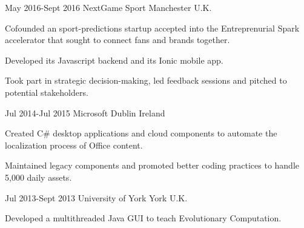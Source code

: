 \documentclass[10pt]{CurriculumVitae}
\begin{document}
      {May 2016-Sept 2016}
      {NextGame Sport} 
      {Manchester}
      {U.K.}
      {
        \item Cofounded an sport-predictions startup accepted into the
          Entreprenurial Spark accelerator that sought to connect fans and brands together.
        \item Developed its Javascript backend and its Ionic mobile app.
        \item Took part in strategic decision-making, led feedback sessions and pitched to potential stakeholders.
      }
  
      {Jul 2014-Jul 2015}
      {Microsoft} 
      {Dublin}
      {Ireland}
      {
        \item Created C\# desktop applications and cloud components to automate the localization
        process of Office content.
        \item Maintained legacy components and promoted better coding practices to handle 5,000 daily assets.
      }
    
      {Jul 2013-Sept 2013}
      {University of York}
      {York}
      {U.K.}
      {
        \item Developed a multithreaded Java GUI to teach Evolutionary Computation.
      } 
\end{document}
